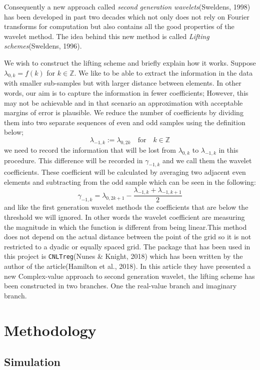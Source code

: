 \documentclass[12pt,twoside, a4paper]{reedthesis}
\begin{document}
Consequently a new approach called \emph{second generation wavelets}(Sweldens, 1998) has been developed in past two decades which not only does not rely on Fourier transforms for computation but also contains all the good properties of the wavelet method. The idea behind this new method is called \emph{Lifting schemes}(Sweldens, 1996).

We wish to construct the lifting scheme and briefly explain how it works. Suppose \(\lambda_{0,k}=f(k)\) for \(k\in\mathbb{Z}\). We like to be able to extract the information in the data with smaller sub-samples but with larger distance between elements. In other words, our aim is to capture the information in fewer coefficients; However, this may not be achievable and in that scenario an approximation with acceptable margins of error is plausible. We reduce the number of coefficients by dividing them into two separate sequences of even and odd samples using the definition below;
\[\lambda_{-1,k}:= \lambda_{0,2k} \quad \text{for}\quad k \in\mathbb{Z}\]
we need to record the information that will be lost from \(\lambda_{0,k}\) to \(\lambda_{-1,k}\) in this procedure. This difference will be recorded in \(\gamma_{-1,k}\)
and we call them the wavelet coefficients. These coefficient will be calculated by averaging two adjacent even elements and subtracting from the odd sample which can be seen in the following:
\[\gamma_{-1,k}=\lambda_{0,2k+1}-\frac{\lambda_{-1,k}+\lambda_{-1,k+1}}{2}\]
and like the first generation wavelet methods the coefficients that are below the threshold we will ignored. In other words the wavelet coefficient are measuring the magnitude in which the function is different from being linear.This method does not depend on the actual distance between the point of the grid so it is not restricted to a dyadic or equally spaced grid.
The package that has been used in this project is \texttt{CNLTreg}(Nunes \& Knight, 2018) which has been written by the author of the article(Hamilton et al., 2018). In this article they have presented a new Complex-value approach to second generation wavelet, the lifting scheme has been constructed in two branches. One the real-value branch and imaginary branch.

\hypertarget{methodology}{%
\chapter{Methodology}\label{methodology}}

\hypertarget{simulation}{%
\section{Simulation}\label{simulation}}
\end{document}
